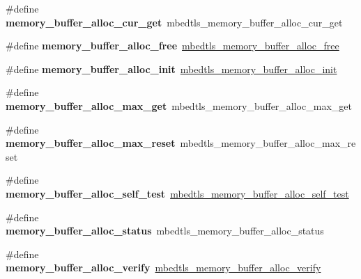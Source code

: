 \begin{DoxyCompactItemize}
\item 
\mbox{\label{compat-1_83_8h_af4d923d718baa32ddc050ad1791b8b08}} 
\#define {\bfseries memory\+\_\+buffer\+\_\+alloc\+\_\+cur\+\_\+get}~mbedtls\+\_\+memory\+\_\+buffer\+\_\+alloc\+\_\+cur\+\_\+get
\item 
\mbox{\label{compat-1_83_8h_a0d092e2c1c12ef0c55b05fb8af4eac39}} 
\#define {\bfseries memory\+\_\+buffer\+\_\+alloc\+\_\+free}~\mbox{\hyperlink{memory__buffer__alloc_8h_ae9d7316a19b72776f34ba74720a06325}{mbedtls\+\_\+memory\+\_\+buffer\+\_\+alloc\+\_\+free}}
\item 
\mbox{\label{compat-1_83_8h_a43294dc7f2f1defa819952ba59f7e980}} 
\#define {\bfseries memory\+\_\+buffer\+\_\+alloc\+\_\+init}~\mbox{\hyperlink{memory__buffer__alloc_8h_ac70d134be54133c272d8eab2cb85dfbf}{mbedtls\+\_\+memory\+\_\+buffer\+\_\+alloc\+\_\+init}}
\item 
\mbox{\label{compat-1_83_8h_a0b6a07fdc3d6c16403e127436959a4a4}} 
\#define {\bfseries memory\+\_\+buffer\+\_\+alloc\+\_\+max\+\_\+get}~mbedtls\+\_\+memory\+\_\+buffer\+\_\+alloc\+\_\+max\+\_\+get
\item 
\mbox{\label{compat-1_83_8h_a119fc4a07965fabfecadc0ae133eb6fd}} 
\#define {\bfseries memory\+\_\+buffer\+\_\+alloc\+\_\+max\+\_\+reset}~mbedtls\+\_\+memory\+\_\+buffer\+\_\+alloc\+\_\+max\+\_\+reset
\item 
\mbox{\label{compat-1_83_8h_a8614a103986002804a2a67b8d33f4236}} 
\#define {\bfseries memory\+\_\+buffer\+\_\+alloc\+\_\+self\+\_\+test}~\mbox{\hyperlink{memory__buffer__alloc_8h_ab1304c317468fb66c21ee52c79efe084}{mbedtls\+\_\+memory\+\_\+buffer\+\_\+alloc\+\_\+self\+\_\+test}}
\item 
\mbox{\label{compat-1_83_8h_a6eac95ba179c3d1404e38aaebf65317f}} 
\#define {\bfseries memory\+\_\+buffer\+\_\+alloc\+\_\+status}~mbedtls\+\_\+memory\+\_\+buffer\+\_\+alloc\+\_\+status
\item 
\mbox{\label{compat-1_83_8h_affa3c902540bce24beda3a6fb7ab770e}} 
\#define {\bfseries memory\+\_\+buffer\+\_\+alloc\+\_\+verify}~\mbox{\hyperlink{memory__buffer__alloc_8h_a7aae8a0cd61f08dd6734ebc8a8a3ba38}{mbedtls\+\_\+memory\+\_\+buffer\+\_\+alloc\+\_\+verify}}

\end{DoxyCompactItemize}

